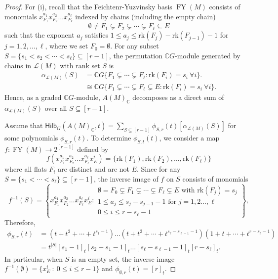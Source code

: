 \documentclass[reqno]{amsart}
\newcommand{\rk}{{\mathrm{rk}}}
\renewcommand{\L}{{\mathcal{L}}}
\newcommand{\Hilb}{{\mathsf{Hilb}}}
\newcommand{\FY}{\operatorname{FY}}
\theoremstyle{definition}
\theoremstyle{remark}
\begin{document}
\begin{proof}
For (i), recall that the Feichtenr-Yuzvinsky basis $\FY(M)$ consists of monomials $x_{F_1}^{a_1}x_{F_2}^{a_2}\ldots x_{F_{\ell}}^{a_{\ell}}$ indexed by chains (including the empty chain)
\[
    \emptyset\neq F_1\subsetneq F_2\subsetneq\cdots\subsetneq F_{\ell}\subseteq{E}
\]
such that the exponent $a_j$ satisfies $1\le a_j\le \rk(F_j)-\rk(F_{j-1})-1$ for $j=1,2,\ldots,\ell$, where we set $F_0=\emptyset$.
For any subset $S=\{s_1<s_2<\cdots<s_{\ell}\}\subseteq [r-1]$, the permutation $\mathbb{C}G$-module generated by chains in $\L(M)$ with rank set $S$ is
\begin{align*}
    \alpha_{\L(M)}(S)
    &=\mathbb{C}G\{F_1\subsetneq \cdots\subsetneq F_{\ell}: \rk(F_i)=s_i~\forall i\}.\\
    &\cong \mathbb{C}G\{F_1\subsetneq \cdots\subsetneq F_{\ell}\subsetneq E: \rk(F_i)=s_i~\forall i\}.
\end{align*}
Hence, as a graded $\mathbb{C}G$-module, $A(M)_{\mathbb{C}}$ decomposes as a direct sum of $\alpha_{\L(M)}(S)$ over all $S\subseteq [r-1]$.

Assume that $
    \Hilb_G(A(M)_{\mathbb{C}},t)=\sum_{S\subseteq [r-1]}\phi_{S,r}(t)[\alpha_{\L(M)}(S)]$
for some polynomials $\phi_{S,r}(t)$. To determine $\phi_{S,t}(t)$, we consider a map $f:\FY(M)\longrightarrow 2^{[r-1]}$ defined by 
\[
    f(x_{F_1}^{a_1}x_{F_2}^{a_2}\ldots x_{F_{\ell}}^{a_{\ell}}x_E^i)=\{\rk(F_1),\rk(F_2),\ldots,\rk(F_{\ell})\}
\]
where all flats $F_i$ are distinct and are not $E$. Since for any $S=\{s_1<\cdots<s_{\ell}\}\subseteq [r-1]$, the inverse image of $f$ on $S$ consists of monomials
\[
    f^{-1}(S)=\left\{x_{F_1}^{a_1}x_{F_2}^{a_2}\ldots x_{F_{\ell}}^{a_{\ell}}x_E^i : \substack{\emptyset=F_0\subsetneq F_1\subsetneq\cdots\subsetneq F_{\ell}\subsetneq E \text{ with }\rk(F_j)=s_j\\
    1\le a_j\le s_j-s_{j-1}-1  \text{ for }j=1,2\ldots,\ell\\
    0\le i\le r-s_{\ell}-1
    }\right\},
\]
Therefore,
\begin{align*}
    \phi_{S,r}(t)
    &=(t+t^2+\cdots+t^{s_1-1})\ldots(t+t^2+\cdots+t^{s_{\ell}-s_{\ell-1}-1})(1+t+\cdots+t^{r-s_{\ell}-1})\\
    &=t^{|S|}[s_1-1]_t[s_2-s_1-1]_t\ldots[s_{\ell}-s_{\ell-1}-1]_t[r-s_{\ell}]_t.
\end{align*}
In particular, when $S$ is an empty set, the inverse image $f^{-1}(\emptyset)=\{x_E^i~:~0\le i\le r-1\}$ and $\phi_{\emptyset,r}(t)=[r]_t$.


\end{proof}
\end{document}
